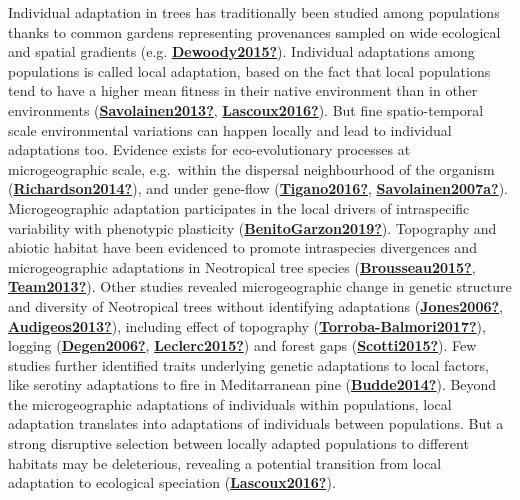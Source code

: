 \documentclass[12pt,twoside,a4paper, a]{article}
\begin{document}
Individual adaptation in trees has traditionally been studied among populations thanks to common gardens representing provenances sampled on wide ecological and spatial gradients (e.g. \protect\hyperlink{ref-Dewoody2015}{\textbf{Dewoody2015?}}).
Individual adaptations among populations is called local adaptation, based on the fact that local populations tend to have a higher mean fitness in their native environment than in other environments (\protect\hyperlink{ref-Savolainen2013}{\textbf{Savolainen2013?}}, \protect\hyperlink{ref-Lascoux2016}{\textbf{Lascoux2016?}}).
But fine spatio-temporal scale environmental variations can happen locally and lead to individual adaptations too.
Evidence exists for eco-evolutionary processes at microgeographic scale,
e.g.~within the dispersal neighbourhood of the organism (\protect\hyperlink{ref-Richardson2014}{\textbf{Richardson2014?}}), and under gene-flow (\protect\hyperlink{ref-Tigano2016}{\textbf{Tigano2016?}}, \protect\hyperlink{ref-Savolainen2007a}{\textbf{Savolainen2007a?}}).
Microgeographic adaptation participates in the local drivers of intraspecific variability with phenotypic plasticity (\protect\hyperlink{ref-BenitoGarzon2019}{\textbf{BenitoGarzon2019?}}).
Topography and abiotic habitat have been evidenced to promote intraspecies divergences and microgeographic adaptations in Neotropical tree species (\protect\hyperlink{ref-Brousseau2015}{\textbf{Brousseau2015?}}, \protect\hyperlink{ref-Team2013}{\textbf{Team2013?}}).
Other studies revealed microgeographic change in genetic structure and diversity of Neotropical trees without identifying adaptations (\protect\hyperlink{ref-Jones2006}{\textbf{Jones2006?}}, \protect\hyperlink{ref-Audigeos2013}{\textbf{Audigeos2013?}}), including effect of topography (\protect\hyperlink{ref-Torroba-Balmori2017}{\textbf{Torroba-Balmori2017?}}), logging (\protect\hyperlink{ref-Degen2006}{\textbf{Degen2006?}}, \protect\hyperlink{ref-Leclerc2015}{\textbf{Leclerc2015?}}) and forest gaps (\protect\hyperlink{ref-Scotti2015}{\textbf{Scotti2015?}}).
Few studies further identified traits underlying genetic adaptations to local factors, like serotiny adaptations to fire in Meditarranean pine (\protect\hyperlink{ref-Budde2014}{\textbf{Budde2014?}}).
Beyond the microgeographic adaptations of individuals within populations, local adaptation translates into adaptations of individuals between populations.
But a strong disruptive selection between locally adapted populations to different habitats may be deleterious,
revealing a potential transition from local adaptation to ecological speciation (\protect\hyperlink{ref-Lascoux2016}{\textbf{Lascoux2016?}}).
\end{document}
